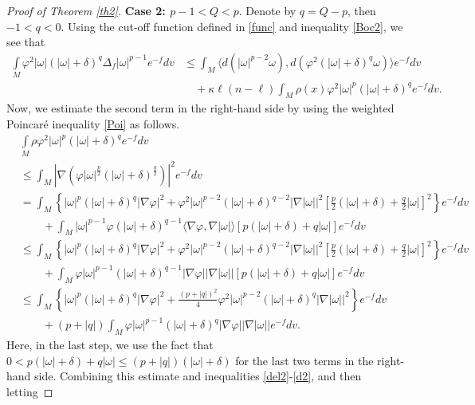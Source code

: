 \documentclass[leqno,12pt]{article} %
\theoremstyle{plain} %
\theoremstyle{definition} %
\numberwithin{equation}{section}
\begin{document}
\begin{proof}[Proof of Theorem \ref{th2}]
	\textbf{Case 2: $p-1<Q<p$}. Denote by $q=Q-p$, then $-1<q<0$. Using the cut-off function defined in \eqref{func} and inequality \eqref{Boc2}, we see that
	\begin{align}\label{c22}\nonumber
		\int\limits_M \varphi ^2|\omega |(|\omega|+\delta)^q \Delta_f |\omega |^{p-1} e^{-f} dv &\le 
		\int_M \langle d(|\omega|^{p-2}\omega),d(\varphi^2 (|\omega|+\delta)^q\omega) \rangle e^{-f}dv\\
		&\quad +\kappa\ell(n-\ell)\int_M \rho(x)\varphi^2 |\omega|^{p}(|\omega|+\delta)^{q}e^{-f}dv.
	\end{align}
	Now, we estimate the second term in the right-hand side by using the weighted Poincar\'e inequality \eqref{Poi} as follows.
	\begin{align}\label{rh} \nonumber
		&\int\limits_M \rho\varphi ^2|\omega |^{p}(|\omega|{+}\delta)^q e^{-f}dv\\\nonumber
		&\le \int_M \left|\nabla \left( \varphi |\omega|^{\frac{p}{2}}(|\omega|{+}\delta)^{\frac{q}{2}} \right)\right|^2 e^{-f}dv\\\nonumber
		&=\int_M \left\{ |\omega|^p (|\omega|{+}\delta)^q |\nabla \varphi|^2 +\varphi^2 |\omega|^{p-2}(|\omega|{+}\delta)^{q-2} |\nabla |\omega||^2 \left[ \frac{p}{2}(|\omega|{+}\delta)+\frac{q}{2}|\omega|  \right]^2 \right\}e^{-f}dv\\\nonumber
		&\qquad + \int_M |\omega|^{p-1}\varphi (|\omega|{+}\delta)^{q-1} \langle \nabla \varphi, \nabla |\omega| \rangle \left[p(|\omega|{+}\delta)+q|\omega|\right]e^{-f}dv\\\nonumber
		&\le \int_M \left\{ |\omega|^p (|\omega|{+}\delta)^q |\nabla \varphi|^2 +\varphi^2 |\omega|^{p-2}(|\omega|{+}\delta)^{q-2} |\nabla |\omega||^2 \left[ \frac{p}{2}(|\omega|{+}\delta)+\frac{q}{2}|\omega|  \right]^2 \right\}e^{-f}dv\\\nonumber
		&\qquad+ \int_M \varphi|\omega|^{p-1} (|\omega|{+}\delta)^{q-1} |\nabla \varphi| |\nabla |\omega||  \left[p(|\omega|{+}\delta)+q|\omega|\right]e^{-f}dv\\\nonumber
		&\le \int_M \left\{ |\omega|^p (|\omega|{+}\delta)^q |\nabla \varphi|^2 +\frac{(p+|q|)^2}{4}\varphi^2 |\omega|^{p-2}(|\omega|{+}\delta)^{q} |\nabla |\omega||^2  \right\}e^{-f}dv\\
		&\qquad + (p+|q|)\int_M \varphi |\omega|^{p-1} (|\omega|{+}\delta)^{q} |\nabla \varphi| |\nabla |\omega|| e^{-f}dv.			
	\end{align}
	Here, in the last step, we use the fact that  $0< p(|\omega|+\delta)+q|\omega|  \le (p+|q|)(|\omega|+\delta)$ for the last two terms in the right-hand side.	Combining this estimate and inequalities \eqref{del2}-\eqref{d2}, and then letting

\end{proof}
\end{document}
